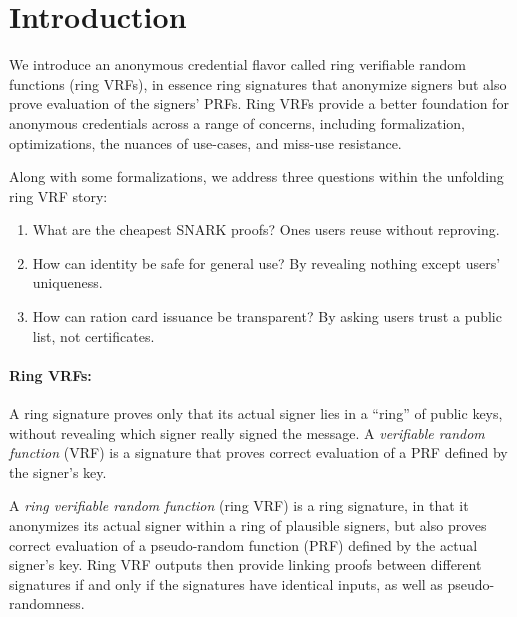 \section{Introduction}

\def\qaudbreak{\eprint{\quad}{\\}}


We introduce an anonymous credential flavor called
 ring verifiable random functions (ring VRFs),
in essence ring signatures that anonymize signers but
 also prove evaluation of the signers' PRFs.
Ring VRFs provide a better foundation for anonymous credentials
across a range of concerns, including formalization, optimizations,
the nuances of use-cases, and miss-use resistance.

Along with some formalizations, we address three questions within
the unfolding ring VRF story:
\begin{enumerate} 
\item
What are the cheapest SNARK proofs?  \qaudbreak
Ones users reuse without reproving.
\item
How can identity be safe for general use?  \qaudbreak
By revealing nothing except users' uniqueness.
\item
How can ration card issuance be transparent?  \qaudbreak
By asking users trust a public list, not certificates.
\end{enumerate}


\paragraph{Ring VRFs:}

A ring signature \cite{ring_accountable,ring_efficient,ring_linkable,ring_noRO,ring_sublinear} proves only that its actual signer lies in a ``ring''
of public keys, without revealing which signer really signed the message.
A {\it verifiable random function} (VRF) is a signature that proves
correct evaluation of a PRF defined by the signer's key.

A {\it ring verifiable random function} (ring VRF) is a ring signature, in
that it anonymizes its actual signer within a ring of plausible signers,
but also proves correct evaluation of a pseudo-random function (PRF)
defined by the actual signer's key. %
%
Ring VRF outputs then provide linking proofs between different signatures
if and only if the signatures have identical inputs, as well as pseudo-randomness.

